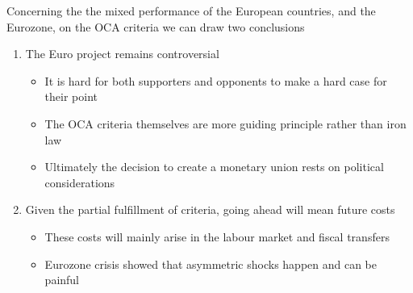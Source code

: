 \documentclass{tufte-handout}
\begin{document}
Concerning the the mixed performance of the European countries, and the Eurozone, on the OCA criteria we can draw two conclusions
\begin{enumerate}
  \item The Euro project remains controversial
  \begin{itemize}
    \item It is hard for both supporters and opponents to make a hard case for their point
    \item The OCA criteria themselves are more guiding principle rather than iron law
    \item Ultimately the decision to create a monetary union rests on political considerations
  \end{itemize}
  \item Given the partial fulfillment of criteria, going ahead will mean future costs
  \begin{itemize}
    \item These costs will mainly arise in the labour market and fiscal transfers
    \item Eurozone crisis showed that asymmetric shocks happen and can be painful
  \end{itemize}
\end{enumerate}
\end{document}
